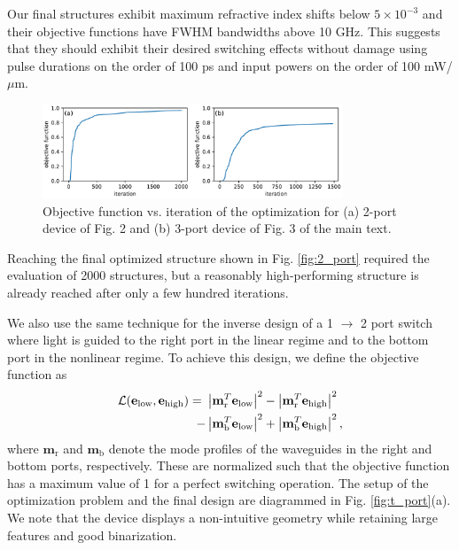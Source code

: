 Our final structures exhibit maximum refractive index shifts below $5\times10^{-3}$ and their objective functions have FWHM bandwidths above 10 GHz.  This suggests that they should exhibit their desired switching effects without damage using pulse durations on the order of 100 ps and input powers on the order of 100 mW/$\mu$m.

\begin{figure}[h]
\centering
\includegraphics[width=0.8\textwidth]{figures/angler_objfns_11_1.pdf}
\caption{\label{fig:objfns} Objective function vs. iteration of the optimization for (a) 2-port device of Fig. 2 and (b) 3-port device of Fig. 3 of the main text.}
\end{figure}
Reaching the final optimized structure shown in Fig. \ref{fig:2_port} required the evaluation of 2000 structures, but a reasonably high-performing structure is already reached after only a few hundred iterations.  

We also use the same technique for the inverse design of a 1 $\to$ 2 port switch where light is guided to the right port in the linear regime and to the bottom port in the nonlinear regime.  To achieve this design, we define the objective function as
%
\begin{align}
    \mathcal{L}(\mathbf{e}_\textrm{low}, \mathbf{e}_\textrm{high}) =~ & \left|\mathbf{m}_\textrm{r}^T \mathbf{e}_\textrm{low}\right|^2 - \left|\mathbf{m}_\textrm{r}^T \mathbf{e}_\textrm{high}\right|^2 \\ \nonumber
    - &\left|\mathbf{m}_\textrm{b}^T \mathbf{e}_\textrm{low}\right|^2 + \left|\mathbf{m}_\textrm{b}^T \mathbf{e}_\textrm{high}\right|^2 ,
\end{align}
%
where $\mathbf{m}_\textrm{r}$ and $\mathbf{m}_\textrm{b}$ denote the mode profiles of the waveguides in the right and bottom ports, respectively. These are normalized such that the objective function has a maximum value of 1 for a perfect switching operation.  The setup of the optimization problem and the final design are diagrammed in Fig. \ref{fig:t_port}(a). We note that the device displays a non-intuitive geometry while retaining large features and good binarization.


